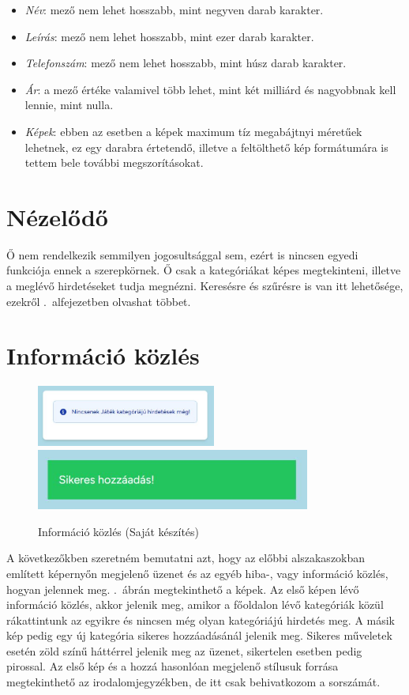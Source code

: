 \documentclass[]{thesis-ekf}
\theoremstyle{definition}
\theoremstyle{remark}
\begin{document}
		\begin{itemize}
			\item \emph{Név}: mező nem lehet hosszabb, mint negyven darab karakter.
			\item \emph{Leírás}: mező nem lehet hosszabb, mint ezer darab karakter.
			\item \emph{Telefonszám}:  mező nem lehet hosszabb, mint húsz darab karakter.
			\item \emph{Ár}: a mező értéke valamivel több lehet, mint két milliárd és nagyobbnak kell lennie, mint nulla.
			\item \emph{Képek}: ebben az esetben a képek maximum tíz megabájtnyi méretűek lehetnek, ez egy darabra értetendő, illetve a feltölthető kép formátumára is tettem bele további megszorításokat.
		\end{itemize}
	\section{Nézelődő}
		Ő nem rendelkezik semmilyen jogosultsággal sem, ezért is nincsen egyedi funkciója ennek a szerepkörnek. Ő csak a kategóriákat képes megtekinteni, illetve a meglévő hirdetéseket tudja megnézni. Keresésre és szűrésre is van itt lehetősége, ezekről .~alfejezetben olvashat többet.
	\section{Információ közlés}
		\begin{figure}[ht!]
			\centering
			\includegraphics[height=2cm]{./felhasznaloi/kategoriaUzenet}
			\includegraphics[height=2cm]{./felhasznaloi/kategoria2}
			\caption{Információ közlés (Saját készítés)} 
			\label{informaciokozles}
		\end{figure}
		A következőkben szeretném bemutatni azt, hogy az előbbi alszakaszokban említett képernyőn megjelenő üzenet és az egyéb hiba-, vagy információ közlés, hogyan jelennek meg. .~ábrán megtekinthető a képek. Az első képen lévő információ közlés, akkor jelenik meg, amikor a főoldalon lévő kategóriák közül rákattintunk az egyikre és nincsen még olyan kategóriájú hirdetés meg. A másik kép pedig egy új kategória sikeres hozzáadásánál jelenik meg. Sikeres műveletek esetén zöld színű háttérrel jelenik meg az üzenet, sikertelen esetben pedig pirossal. Az első kép és a hozzá hasonlóan megjelenő stílusuk forrása megtekinthető az irodalomjegyzékben, de itt csak behivatkozom a sorszámát. \cite{FlowBite}
		
\end{document}
